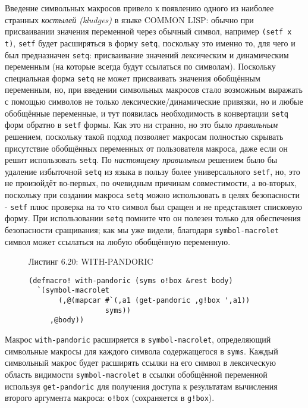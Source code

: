Введение символьных макросов привело к появлению одного из наиболее странных \emph{костылей (kludges)} в языке COMMON LISP: обычно при присваивании значения переменной через обычный символ, например \verb"(setf x t)", \verb"setf" будет расширяться в форму \verb"setq", поскольку это именно то, для чего и был предназначен \verb"setq": присваивание значений лексическим и динамическим переменным (на которые всегда будут ссылаться по символам). Поскольку специальная форма \verb"setq" не может присваивать значения обобщённым переменным, но, при введении символьных макросов стало возможным выражать с помощью символов не только лексические/динамические привязки, но и любые обобщённые переменные, и тут появилась необходимость в конвертации \verb"setq" форм обратно в \verb"setf" формы. Как это ни странно, но это было \emph{правильным} решением, поскольку такой подход позволяет макросам полностью скрывать присутствие обобщённых переменных от пользователя макроса, даже если он решит использовать \verb"setq". По \emph{настоящему правильным} решением было бы удаление избыточной \verb"setq" из языка в пользу более универсального \verb"setf", но, это не произойдёт во-первых, по очевидным причинам совместимости, а во-вторых, поскольку при создании макроса \verb"setq" можно использовать в целях безопасности - \verb"setf" плюс проверка на то что символ был сращен и не представляет списковую форму. При использовании \verb"setq" помните что он полезен только для обеспечения безопасности сращивания; как мы уже видели, благодаря \verb"symbol-macrolet" символ может ссылаться на любую обобщённую переменную.

\begin{figure}Листинг 6.20: WITH-PANDORIC\label{listing_6.20}
\listbegin
\begin{verbatim}
(defmacro! with-pandoric (syms o!box &rest body)
  `(symbol-macrolet
       (,@(mapcar #`(,a1 (get-pandoric ,g!box ',a1))
                  syms))
     ,@body))
\end{verbatim}
\listend
\end{figure}

Макрос \verb"with-pandoric" расширяется в \verb"symbol-macrolet", определяющий символьные макросы для каждого символа содержащегося в \verb"syms". Каждый символьный макрос будет расширять ссылки на его символ в лексическую область видимости \verb"symbol-macrolet" в ссылки обобщённой переменной используя \verb"get-pandoric" для получения доступа к результатам вычисления второго аргумента макроса: \verb"o!box" (сохраняется в \verb"g!box").

